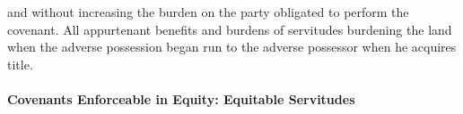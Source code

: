 \begin{enumerate}
\begin{enumerate}
\begin{enumerate}
\begin{enumerate}
                and without increasing the burden on the party obligated to 
                perform the covenant. All appurtenant benefits and burdens of 
                servitudes burdening the land when the adverse possession 
                began run to the adverse possessor when he acquires title.
            \end{enumerate}
        \end{enumerate}
    \end{enumerate}
\end{enumerate}

\paragraph{Covenants Enforceable in Equity: Equitable Servitudes}

